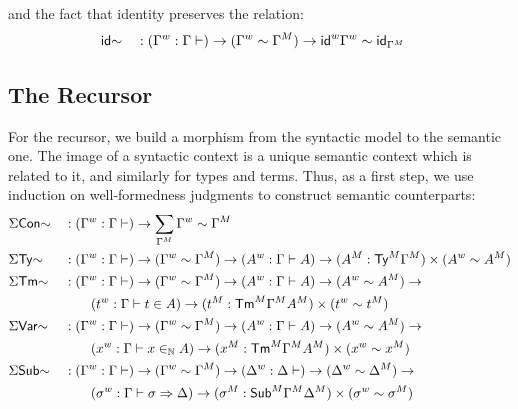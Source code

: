   and the fact that identity preserves the relation:
  \begin{alignat*}{5}
     & {\mathsf{id}}{\sim} && :
    ({\Gamma}^w : \Gamma \vdash ) \rightarrow
  ({\Gamma}^w \sim {\Gamma}^M) \rightarrow
   {{\mathsf{id}}}^w{\Gamma}^w \sim {\mathsf{id}}_{{\Gamma}^M}
  \end{alignat*}


\subsection{The Recursor}
For the recursor, we build a morphism from the syntactic model to the semantic
one. The image of a syntactic context is a unique semantic context which is
related to it, and similarly for types and terms.
Thus, as a first step, we use induction on well-formedness judgments to construct
semantic counterparts:
  \begin{alignat*}{5}
     & \Sigma\mathsf{Con}{\sim} && :
    ({\Gamma}^w : \Gamma \vdash ) \rightarrow
    \sum_{{\Gamma}^M} {\Gamma}^w \sim {\Gamma}^M
    \\
     & \Sigma\mathsf{Ty}{\sim} && :
    ({\Gamma}^w : \Gamma \vdash ) \rightarrow
    ({\Gamma}^w\sim {\Gamma}^M) \rightarrow
    ({A}^w : \Gamma \vdash A ) \rightarrow
    ({{A}^M:{\mathsf{Ty}}^M{\Gamma}^M})\times ( {A}^w \sim {A}^M)
    \\
     & \Sigma\mathsf{Tm}{\sim} && :
    ({\Gamma}^w : \Gamma \vdash ) \rightarrow
    ({\Gamma}^w\sim {\Gamma}^M) \rightarrow
    ({A}^w : \Gamma \vdash A ) \rightarrow
    ( {A}^w \sim {A}^M) \rightarrow
    \\ & && \qquad
    ({t}^w : \Gamma \vdash t \in A ) \rightarrow
    ({{t}^M:{\mathsf{Tm}}^M{\Gamma}^M}{A}^M)\times ( {t}^w \sim {t}^M)
    \\
     & \Sigma\mathsf{Var}{\sim} && :
    ({\Gamma}^w : \Gamma \vdash ) \rightarrow
    ({\Gamma}^w\sim {\Gamma}^M) \rightarrow
    ({A}^w : \Gamma \vdash A ) \rightarrow
    ( {A}^w \sim {A}^M) \rightarrow
    \\ & && \qquad
    ({x}^w : \Gamma \vdash x \in_{\mathbb{N}} A ) \rightarrow
    ({{x}^M:{\mathsf{Tm}}^M{\Gamma}^M}{A}^M)\times ( {x}^w \sim {x}^M)
    \\
     & \Sigma\mathsf{Sub}{\sim} && :
    ({\Gamma}^w : \Gamma \vdash ) \rightarrow
    ({\Gamma}^w\sim {\Gamma}^M) \rightarrow
    ({\Delta}^w : \Delta \vdash  ) \rightarrow
    ( {\Delta}^w \sim {\Delta}^M) \rightarrow
    \\ & && \qquad
    ({\sigma}^w : \Gamma \vdash \sigma \Rightarrow \Delta ) \rightarrow
    ({{\sigma}^M:{\mathsf{Sub}}^M{\Gamma}^M}{\Delta}^M)\times ( {\sigma}^w \sim {\sigma}^M)
  \end{alignat*}
